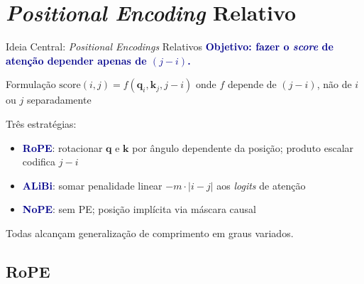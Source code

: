 \documentclass[aspectratio=169, xcolor=dvipsnames]{beamer}
\begin{document}
  \section{\textit{Positional Encoding} Relativo}

  \begin{frame}{Ideia Central: \textit{Positional Encodings} Relativos}
    \textcolor{DarkBlue}{\textbf{Objetivo: fazer o \textit{score} de atenção depender apenas de $(j - i)$.}}

    \begin{block}{Formulação}
      $\text{score}(i, j) = f(\mathbf{q}_i, \mathbf{k}_j, j{-}i)$ \quad onde $f$ depende de $(j{-}i)$, não de $i$ ou $j$ separadamente
    \end{block}

    \vspace{0.3em}
    Três estratégias:
    \begin{itemize}
      \item \textcolor{DarkBlue}{\textbf{RoPE}}: rotacionar $\mathbf{q}$ e $\mathbf{k}$ por ângulo dependente da posição; produto escalar codifica $j{-}i$
      \item \textcolor{DarkBlue}{\textbf{ALiBi}}: somar penalidade linear $-m \cdot |i{-}j|$ aos \textit{logits} de atenção
      \item \textcolor{DarkBlue}{\textbf{NoPE}}: sem PE; posição implícita via máscara causal
    \end{itemize}

    Todas alcançam generalização de comprimento em graus variados.
  \end{frame}

  \subsection{RoPE}
\end{document}
